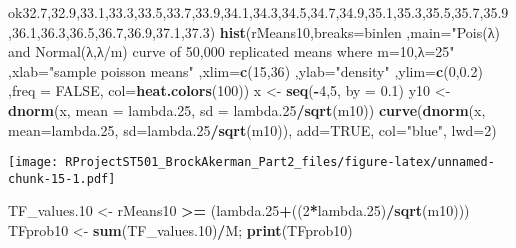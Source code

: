 \documentclass[
]{article}
\newenvironment{Shaded}{\begin{snugshade}}{\end{snugshade}}
\newcommand{\DataTypeTok}[1]{\textcolor[rgb]{0.13,0.29,0.53}{#1}}
\newcommand{\DecValTok}[1]{\textcolor[rgb]{0.00,0.00,0.81}{#1}}
\newcommand{\FloatTok}[1]{\textcolor[rgb]{0.00,0.00,0.81}{#1}}
\newcommand{\KeywordTok}[1]{\textcolor[rgb]{0.13,0.29,0.53}{\textbf{#1}}}
\newcommand{\NormalTok}[1]{#1}
\newcommand{\OperatorTok}[1]{\textcolor[rgb]{0.81,0.36,0.00}{\textbf{#1}}}
\newcommand{\OtherTok}[1]{\textcolor[rgb]{0.56,0.35,0.01}{#1}}
\newcommand{\StringTok}[1]{\textcolor[rgb]{0.31,0.60,0.02}{#1}}
\begin{document}
\begin{Shaded}
\begin{Highlighting}[]
ok{32.7}\NormalTok{,}\FloatTok{32.9}\NormalTok{,}\FloatTok{33.1}\NormalTok{,}\FloatTok{33.3}\NormalTok{,}\FloatTok{33.5}\NormalTok{,}\FloatTok{33.7}\NormalTok{,}\FloatTok{33.9}\NormalTok{,}\FloatTok{34.1}\NormalTok{,}\FloatTok{34.3}\NormalTok{,}\FloatTok{34.5}\NormalTok{,}\FloatTok{34.7}\NormalTok{,}\FloatTok{34.9}\NormalTok{,}\FloatTok{35.1}\NormalTok{,}\FloatTok{35.3}\NormalTok{,}\FloatTok{35.5}\NormalTok{,}\FloatTok{35.7}\NormalTok{,}\FloatTok{35.9}\NormalTok{,}\FloatTok{36.1}\NormalTok{,}\FloatTok{36.3}\NormalTok{,}\FloatTok{36.5}\NormalTok{,}\FloatTok{36.7}\NormalTok{,}\FloatTok{36.9}\NormalTok{,}\FloatTok{37.1}\NormalTok{,}\FloatTok{37.3}\NormalTok{)}
\KeywordTok{hist}\NormalTok{(rMeans10,}\DataTypeTok{breaks=}\NormalTok{binlen ,}\DataTypeTok{main=}\StringTok{"Pois(λ) and Normal(λ,λ/m) curve of 50,000 replicated means where m=10,λ=25"}\NormalTok{ ,}\DataTypeTok{xlab=}\StringTok{"sample poisson means"}\NormalTok{ ,}\DataTypeTok{xlim=}\KeywordTok{c}\NormalTok{(}\DecValTok{15}\NormalTok{,}\DecValTok{36}\NormalTok{) ,}\DataTypeTok{ylab=}\StringTok{"density"}\NormalTok{ ,}\DataTypeTok{ylim=}\KeywordTok{c}\NormalTok{(}\DecValTok{0}\NormalTok{,}\FloatTok{0.2}\NormalTok{) ,}\DataTypeTok{freq =} \OtherTok{FALSE}\NormalTok{, }\DataTypeTok{col=}\KeywordTok{heat.colors}\NormalTok{(}\DecValTok{100}\NormalTok{))}
\NormalTok{x <-}\StringTok{ }\KeywordTok{seq}\NormalTok{(}\OperatorTok{-}\DecValTok{4}\NormalTok{,}\DecValTok{5}\NormalTok{, }\DataTypeTok{by =} \FloatTok{0.1}\NormalTok{)}
\NormalTok{y10 <-}\StringTok{ }\KeywordTok{dnorm}\NormalTok{(x, }\DataTypeTok{mean =}\NormalTok{ lambda}\FloatTok{.25}\NormalTok{, }\DataTypeTok{sd =}\NormalTok{ lambda}\FloatTok{.25}\OperatorTok{/}\KeywordTok{sqrt}\NormalTok{(m10))}
\KeywordTok{curve}\NormalTok{(}\KeywordTok{dnorm}\NormalTok{(x, }\DataTypeTok{mean=}\NormalTok{lambda}\FloatTok{.25}\NormalTok{, }\DataTypeTok{sd=}\NormalTok{lambda}\FloatTok{.25}\OperatorTok{/}\KeywordTok{sqrt}\NormalTok{(m10)), }\DataTypeTok{add=}\OtherTok{TRUE}\NormalTok{, }\DataTypeTok{col=}\StringTok{"blue"}\NormalTok{, }\DataTypeTok{lwd=}\DecValTok{2}\NormalTok{)}
\end{Highlighting}
\end{Shaded}

\texttt{[image: RProjectST501\_BrockAkerman\_Part2\_files/figure-latex/unnamed-chunk-15-1.pdf]}

\begin{Shaded}
\begin{Highlighting}[]
\NormalTok{TF_values}\FloatTok{.10}\NormalTok{ <-}\StringTok{ }\NormalTok{rMeans10 }\OperatorTok{>=}\StringTok{ }\NormalTok{(lambda}\FloatTok{.25}\OperatorTok{+}\NormalTok{((}\DecValTok{2}\OperatorTok{*}\NormalTok{lambda}\FloatTok{.25}\NormalTok{)}\OperatorTok{/}\KeywordTok{sqrt}\NormalTok{(m10)))}
\NormalTok{TFprob10 <-}\StringTok{ }\KeywordTok{sum}\NormalTok{(TF_values}\FloatTok{.10}\NormalTok{)}\OperatorTok{/}\NormalTok{M; }\KeywordTok{print}\NormalTok{(TFprob10)}
\end{Highlighting}
\end{Shaded}
\end{document}

